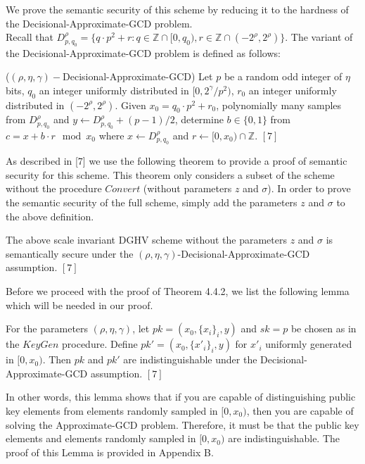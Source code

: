 \documentclass[../../main.tex]{subfiles}
\begin{document}
\noindent We prove the semantic security of this scheme by reducing it to the hardness of the Decisional-Approximate-GCD problem. \\

\noindent Recall that $D^\rho_{p,q_0}=\{q \cdot p^2 + r : q \in \mathbb{Z} \cap [0,q_0), r \in \mathbb{Z} \cap (-2^\rho, 2^\rho)\}$. The variant of the Decisional-Approximate-GCD problem is defined as follows:

\begin{addmargin}[1em]{2em}%
\begin{defn} ($(\rho,\eta,\gamma)-$Decisional-Approximate-GCD)
Let $p$ be a random odd integer of $\eta$ bits, $q_0$ an integer uniformly distributed in $[0,2^\gamma/p^2)$, $r_0$ an integer uniformly distributed in $(-2^\rho,2^\rho)$. Given $x_0 = q_0 \cdot p^2 + r_0$, polynomially many samples from $D^\rho_{p,q_0}$ and $y \leftarrow D^\rho_{p,q_0} + (p-1)/2$, determine $b \in \{0,1\}$ from $c=x+b \cdot r \mod x_0$ where $x \leftarrow D^\rho_{p,q_0}$ and $r \leftarrow [0,x_0) \cap \mathbb{Z}$. $[7]$
\end{defn}
\end{addmargin} 
\medskip
\noindent As described in [7] we use the following theorem to provide a proof of semantic security for this scheme. This theorem only considers a subset of the scheme without the procedure $Convert$ (without parameters $z$ and $\sigma$). In order to prove the semantic security of the full scheme, simply add the parameters $z$ and $\sigma$ to the above definition.

\begin{addmargin}[1em]{2em}%
\begin{thm}
The above scale invariant DGHV scheme without the parameters $z$ and $\sigma$ is semantically secure under the $(\rho,\eta,\gamma)$-Decisional-Approximate-GCD assumption. $[7]$
\end{thm}
\end{addmargin}
\medskip
\noindent Before we proceed with the proof of Theorem 4.4.2, we list the following lemma which will be needed in our proof.

\begin{addmargin}[1em]{2em}%
\begin{lemma}
For the parameters $(\rho,\eta,\gamma)$, let $pk = (x_0, \{x_i\}_i, y)$ and $sk=p$ be chosen as in the $KeyGen$ procedure. Define $pk'=(x_0,\{x'_i\}_i,y)$ for $x'_i$ uniformly generated in $[0,x_0)$. Then $pk$ and $pk'$ are indistinguishable under the Decisional-Approximate-GCD assumption. $[7]$
\end{lemma}
\end{addmargin}
\medskip
\noindent In other words, this lemma shows that if you are capable of distinguishing public key elements from elements randomly sampled in $[0,x_0)$, then you are capable of solving the Approximate-GCD problem. Therefore, it must be that the public key elements and elements randomly sampled in $[0,x_0)$ are indistinguishable. The proof of this Lemma is provided in Appendix B. \\
\end{document}
